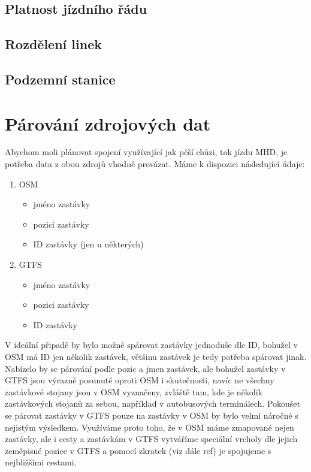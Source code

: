\subsection{Platnost jízdního řádu}

\subsection{Rozdělení linek}

\subsection{Podzemní stanice}


\section{Párování zdrojových dat}
Abychom moli plánovat spojení využívající jak pěší chůzi, tak jízdu MHD, je
potřeba data z obou zdrojů vhodně provázat. Máme k dispozici následující údaje:
\begin{enumerate}
\item OSM
\begin{itemize}
	\item jméno zastávky
	\item pozici zastávky
	\item ID zastávky (jen u některých)
\end{itemize}
\item GTFS
\begin{itemize}
	\item jméno zastávky
	\item pozici zastávky
	\item ID zastávky
\end{itemize}
\end{enumerate} 
V ideální připadě by bylo možné spárovat zastávky jednoduše dle ID, bohužel v
OSM má ID jen několik zastávek, většinu zastávek je tedy potřeba spárovat jinak.
Nabízelo by se párování podle pozic a jmen zastávek, ale bohužel zastávky v GTFS
jsou výrazně posunuté oproti OSM i skutečnosti, navíc ne všechny zastávkové
stojany jsou v OSM vyznačeny, zvláště tam, kde je několik zastávkových stojanů
za sebou, například v autobusových terminálech. Pokoušet se párovat zastávky v
GTFS pouze na zastávky v OSM by bylo velmi náročné s nejistým výsledkem.
Využíváme proto toho, že v OSM máme zmapované nejen zastávky, ale i cesty a
zastávkám v GTFS vytváříme speciální vrcholy dle jejich zeměpisné pozice v GTFS
a pomocí zkratek (viz dále \TODO ref) je spojujeme s nejbližšími cestami.

